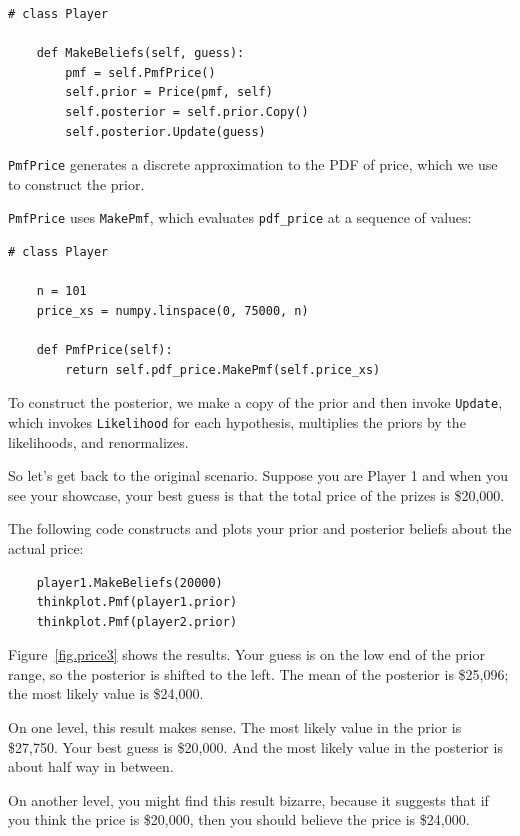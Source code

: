 \documentclass[12pt]{book}
\begin{document}
\begin{verbatim}
# class Player

    def MakeBeliefs(self, guess):
        pmf = self.PmfPrice()
        self.prior = Price(pmf, self)
        self.posterior = self.prior.Copy()
        self.posterior.Update(guess)
\end{verbatim}

{\tt PmfPrice} generates a discrete approximation
to the PDF of price, which we use to construct the prior.

{\tt PmfPrice} uses {\tt MakePmf}, which
evaluates \verb"pdf_price" at a sequence of values:

\begin{verbatim}
# class Player

    n = 101
    price_xs = numpy.linspace(0, 75000, n)

    def PmfPrice(self):
        return self.pdf_price.MakePmf(self.price_xs)
\end{verbatim}

To construct the posterior, we make a copy of the
prior and then invoke {\tt Update}, which invokes {\tt Likelihood}
for each hypothesis, multiplies the priors by the likelihoods,
and  renormalizes.

So let's get back to the original scenario.  Suppose you are
Player 1 and when you see your showcase, your best guess is
that the total price of the prizes is \$20,000.

The following code constructs and plots your prior and
posterior beliefs about the actual price:

\begin{verbatim}
    player1.MakeBeliefs(20000)
    thinkplot.Pmf(player1.prior)
    thinkplot.Pmf(player2.prior)
\end{verbatim}

Figure~\ref{fig.price3} shows the results.  Your guess 
is on the low end of the prior range, so the posterior is shifted
to the left.  The mean of the posterior is \$25,096; the most
likely value is \$24,000.

On one level, this result makes sense.  The most likely value
in the prior is \$27,750.  Your best guess is \$20,000.  And the
most likely value in the posterior is about half way in between.

On another level, you might find this result bizarre, because it
suggests that if you think the price is \$20,000, then you
should believe the price is \$24,000.
\end{document}
